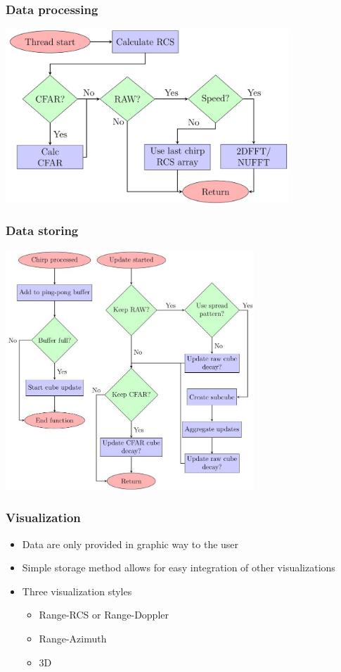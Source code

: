 \documentclass[aspectratio=43]{beamer}
\begin{document}
\begin{frame}[fragile]
  \frametitle{Data processing}
  \begin{center}
    \includegraphics[width=0.8\textwidth]{../img/dataflow_2.jpg}
  \end{center}
\end{frame}

\begin{frame}[fragile]
  \frametitle{Data storing}
  \begin{center}
    \includegraphics[width=0.7\textwidth]{../img/dataflow_3.jpg}
  \end{center}
\end{frame}

\begin{frame}[fragile]
  \frametitle{Visualization}
  \begin{itemize}
    \item Data are only provided in graphic way to the user
    \item Simple storage method allows for easy integration of other visualizations
    \item Three visualization styles
      \begin{itemize}
        \item Range-RCS or Range-Doppler
        \item Range-Azimuth
        \item 3D
      \end{itemize}
  \end{itemize}
\end{frame}
\end{document}
